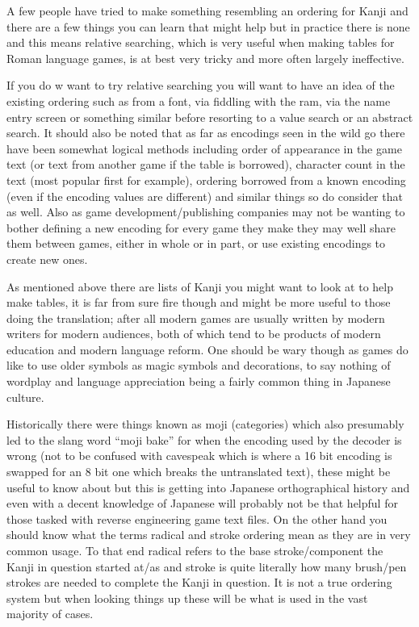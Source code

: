 \documentclass[
]{book}
\begin{document}
A few people have tried to make something resembling an ordering for Kanji and there are a few things you can learn that might help but in practice there is none and this means relative searching, which is very useful when making tables for Roman language games, is at best very tricky and more often largely ineffective.

If you do w want to try relative searching you will want to have an idea of the existing ordering such as from a font, via fiddling with the ram, via the name entry screen or something similar before resorting to a value search or an abstract search. It should also be noted that as far as encodings seen in the wild go there have been somewhat logical methods including order of appearance in the game text (or text from another game if the table is borrowed), character count in the text (most popular first for example), ordering borrowed from a known encoding (even if the encoding values are different) and similar things so do consider that as well. Also as game development/publishing companies may not be wanting to bother defining a new encoding for every game they make they may well share them between games, either in whole or in part, or use existing encodings to create new ones.

As mentioned above there are lists of Kanji you might want to look at to help make tables, it is far from sure fire though and might be more useful to those doing the translation; after all modern games are usually written by modern writers for modern audiences, both of which tend to be products of modern education and modern language reform. One should be wary though as games do like to use older symbols as magic symbols and decorations, to say nothing of wordplay and language appreciation being a fairly common thing in Japanese culture.

Historically there were things known as moji (categories) which also presumably led to the slang word ``moji bake'' for when the encoding used by the decoder is wrong (not to be confused with cavespeak which is where a 16 bit encoding is swapped for an 8 bit one which breaks the untranslated text), these might be useful to know about but this is getting into Japanese orthographical history and even with a decent knowledge of Japanese will probably not be that helpful for those tasked with reverse engineering game text files. On the other hand you should know what the terms radical and stroke ordering mean as they are in very common usage. To that end radical refers to the base stroke/component the Kanji in question started at/as and stroke is quite literally how many brush/pen strokes are needed to complete the Kanji in question. It is not a true ordering system but when looking things up these will be what is used in the vast majority of cases.
\end{document}
